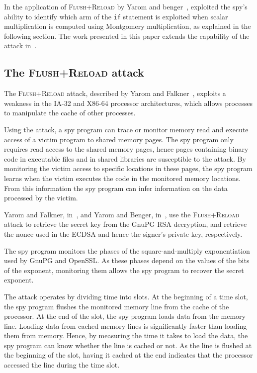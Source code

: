 \documentclass[twocolumn]{article}
\newcommand{\fl}{\textsc{Flu\-sh+\allowbreak Re\-load}\xspace}
\newcommand{\myupcase}[1]{\uppercase{#1}}
\begin{document}
In the application of \fl by Yarom and benger~\cite{yarom_benger_2013}, exploited the spy's ability to identify which arm of the \texttt{if} statement is exploited when scalar multiplication is computed using Montgomery multiplication, as explained in the following section. The work presented in this paper extends the capability of the attack in~\cite{yarom_benger_2013}.


\subsection{The \fl attack}

The \fl attack, described by Yarom and Falkner~\cite{yarom13flush}, exploits a weakness in the IA-32 and X86-64 processor architectures, which allows processes to manipulate the cache of other processes.

Using the attack, a spy program can trace or monitor memory read and execute access of a victim program to shared memory pages.
The spy program only requires read access to the shared memory pages, hence pages containing binary code in executable files and in shared libraries are susceptible to the attack.
By monitoring the victim access to specific locations in these pages, the spy program learns when the victim
executes the code in the monitored memory locations.
From this information the spy program can infer information on the data processed by the victim.

Yarom and Falkner, in~\cite{yarom13flush}, and Yarom and Benger, in~\cite{yarom_benger_2013}, use the \fl attack to retrieve the secret key from the GnuPG RSA decryption, and retrieve the nonce used in the \myupcase{ecdsa} and hence the signer's private key, respectively. 


The spy program monitors the phases of the square-and-multiply exponentiation~\cite{gordon98survey} used by GnuPG and OpenSSL. As these phases depend on the values of the bits of the exponent, monitoring them allows the spy program to recover the secret exponent.

The attack operates by dividing time into slots. At the beginning of a time slot, the spy program flushes the monitored memory line from the cache of the processor. At the end of the slot, the spy program loads data from the memory line. Loading data from cached memory lines is significantly faster than loading them from memory. Hence, by measuring the time it takes to load the data, the spy program can know whether the line is cached or not. As the line is flushed at the beginning of the slot, having it cached at the end indicates that the processor accessed the line during the time slot.
\end{document}

